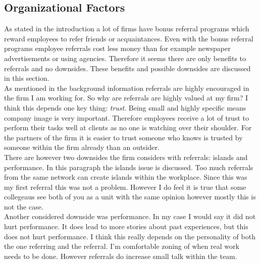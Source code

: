 \documentclass[Main.tex]{subfiles}
\begin{document}
\subsection*{Organizational Factors}

As stated in the introduction a lot of firms have bonus referral programs which reward employees to refer friends or acquaintances. Even with the bonus referral programs employee referrals cost less money than for example newspaper advertisements or using agencies. Therefore it seems there are only benefits to referrals and no downsides. These benefits and possible downsides are discussed in this section.\\

As mentioned in the background information referrals are highly encouraged in the firm I am working for. So why are referrals are highly valued at my firm? I think this depends one key thing: \emph{trust}. Being small and highly specific means company image is very important. Therefore employees receive a lot of trust to perform their tasks well at clients as no one is watching over their shoulder. For the partners of the firm it is easier to trust someone who knows is trusted by someone within the firm already than an outsider. \\

There are however two downsides the firm considers with referrals: islands and performance. In this paragraph the islands issue is discussed. Too much referrals from the same network can create islands within the workplace. Since this was my first referral this was not a problem. However I do feel it is true that some collegeaus see both of you as a unit with the same opinion however mostly this is not the case. \\

Another considered downside was performance. In my case I would say it did not hurt performance. It does lead to more stories about past experiences, but this does not hurt performance. I think this really depends on the personality of both the one referring and the referral. I'm comfortable zoning of when real work needs to be done. However referrals do increase small talk within the team. 
\end{document}
